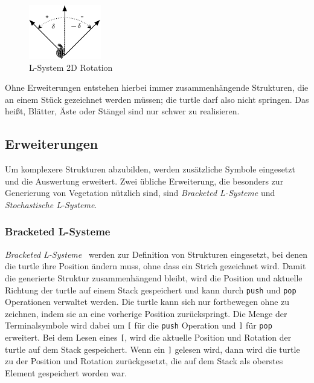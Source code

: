 \begin{figure}[ht]
    \centering
    \includegraphics[width=0.5\linewidth]{chapters/02_Grundlagen/L_System/L_System_2D.pdf}
    \caption{L-System 2D Rotation}\label{fig:L-System 2D Rotation}
\end{figure}

Ohne Erweiterungen entstehen hierbei immer zusammenhängende Strukturen, die an einem Stück gezeichnet werden müssen; die turtle darf also nicht springen.
Das heißt, Blätter, Äste oder Stängel sind nur schwer zu realisieren.


\subsection{Erweiterungen}
Um komplexere Strukturen abzubilden, werden zusätzliche Symbole eingesetzt und die Auswertung erweitert.
Zwei übliche Erweiterung, die besonders zur Generierung von Vegetation nützlich sind, sind \emph{Bracketed L-Systeme} und \emph{Stochastische L-Systeme}.

\subsubsection{Bracketed L-Systeme}
\emph{Bracketed L-Systeme}~\cite*{Shaker2016} werden zur Definition von Strukturen eingesetzt, bei denen die turtle ihre Position ändern muss, ohne dass ein Strich gezeichnet wird.
Damit die generierte Struktur zusammenhängend bleibt, wird die Position und aktuelle Richtung der turtle auf einem Stack gespeichert und kann durch \texttt{push} und \texttt{pop} Operationen verwaltet werden.
Die turtle kann sich nur fortbewegen ohne zu zeichnen, indem sie an eine vorherige Position zurückspringt.
Die Menge der Terminalsymbole wird dabei um \texttt{[} für die \texttt{push} Operation und \texttt{]} für \texttt{pop} erweitert.
Bei dem Lesen eines \texttt{[}, wird die aktuelle Position und Rotation der turtle auf dem Stack gespeichert.
Wenn ein \texttt{]} gelesen wird, dann wird die turtle zu der Position und Rotation zurückgesetzt, die auf dem Stack als oberstes Element gespeichert worden war.


